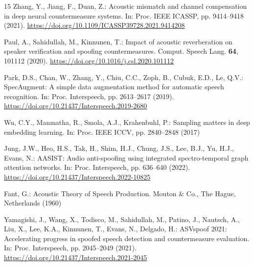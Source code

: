 \documentclass[runningheads]{llncs}
\begin{document}
\begin{thebibliography}{15}
Zhang, Y., Jiang, F., Duan, Z.: Acoustic mismatch and channel compensation in deep neural countermeasure systems. In: Proc. IEEE ICASSP, pp. 9414--9418 (2021). \url{https://doi.org/10.1109/ICASSP39728.2021.9414208}

Paul, A., Sahidullah, M., Kinnunen, T.: Impact of acoustic reverberation on speaker verification and spoofing countermeasures. Comput. Speech Lang. \textbf{64}, 101112 (2020). \url{https://doi.org/10.1016/j.csl.2020.101112}

Park, D.S., Chan, W., Zhang, Y., Chiu, C.C., Zoph, B., Cubuk, E.D., Le, Q.V.: SpecAugment: A simple data augmentation method for automatic speech recognition. In: Proc. Interspeech, pp. 2613--2617 (2019). \url{https://doi.org/10.21437/Interspeech.2019-2680}

Wu, C.Y., Manmatha, R., Smola, A.J., Krahenbuhl, P.: Sampling matters in deep embedding learning. In: Proc. IEEE ICCV, pp. 2840--2848 (2017)

Jung, J.W., Heo, H.S., Tak, H., Shim, H.J., Chung, J.S., Lee, B.J., Yu, H.J., Evans, N.: AASIST: Audio anti-spoofing using integrated spectro-temporal graph attention networks. In: Proc. Interspeech, pp. 636--640 (2022). \url{https://doi.org/10.21437/Interspeech.2022-10825}

Fant, G.: Acoustic Theory of Speech Production. Mouton \& Co., The Hague, Netherlands (1960)

Yamagishi, J., Wang, X., Todisco, M., Sahidullah, M., Patino, J., Nautsch, A., Liu, X., Lee, K.A., Kinnunen, T., Evans, N., Delgado, H.: ASVspoof 2021: Accelerating progress in spoofed speech detection and countermeasure evaluation. In: Proc. Interspeech, pp. 2045--2049 (2021). \url{https://doi.org/10.21437/Interspeech.2021-2045}

\end{thebibliography}
\end{document}
